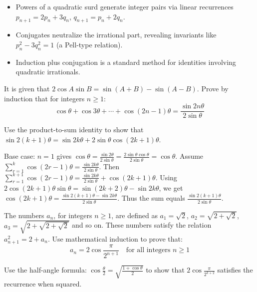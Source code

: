 \begin{takeaways}
\begin{itemize}[leftmargin=*]
\item Powers of a quadratic surd generate integer pairs via linear recurrences $p_{n+1} = 2p_n + 3q_n$, $q_{n+1} = p_n + 2q_n$.
\item Conjugates neutralize the irrational part, revealing invariants like $p_n^2 - 3q_n^2 = 1$ (a Pell-type relation).
\item Induction plus conjugation is a standard method for identities involving quadratic irrationals.
\end{itemize}
\end{takeaways}

\begin{problem}
It is given that $2\cos A \sin B = \sin(A+B) - \sin(A-B)$. Prove by induction that for integers $n \ge 1$:
\[\cos \theta + \cos 3\theta + \cdots + \cos(2n-1)\theta = \frac{\sin 2n\theta}{2\sin\theta}\]
\end{problem}

\begin{hint}
Use the product-to-sum identity to show that $\sin 2(k+1)\theta = \sin 2k\theta + 2\sin\theta \cos(2k+1)\theta$.
\end{hint}

\begin{solution}[Sketch]
Base case: $n=1$ gives $\cos \theta = \frac{\sin 2\theta}{2\sin\theta} = \frac{2\sin\theta\cos\theta}{2\sin\theta} = \cos\theta$. Assume $\sum_{r=1}^{k} \cos(2r-1)\theta = \frac{\sin 2k\theta}{2\sin\theta}$. Then $\sum_{r=1}^{k+1} \cos(2r-1)\theta = \frac{\sin 2k\theta}{2\sin\theta} + \cos(2k+1)\theta$. Using $2\cos(2k+1)\theta \sin\theta = \sin(2k+2)\theta - \sin 2k\theta$, we get $\cos(2k+1)\theta = \frac{\sin 2(k+1)\theta - \sin 2k\theta}{2\sin\theta}$. Thus the sum equals $\frac{\sin 2(k+1)\theta}{2\sin\theta}$.
\end{solution}

\begin{problem}
The numbers $a_n$, for integers $n \ge 1$, are defined as $a_1 = \sqrt{2}$, $a_2 = \sqrt{2+\sqrt{2}}$, $a_3 = \sqrt{2+\sqrt{2+\sqrt{2}}}$ and so on. These numbers satisfy the relation $a_{n+1}^2 = 2 + a_n$. Use mathematical induction to prove that:
\[a_n = 2\cos\frac{\pi}{2^{n+1}} \quad \text{for all integers } n \ge 1\]
\end{problem}

\begin{hint}
Use the half-angle formula: $\cos\frac{\theta}{2} = \sqrt{\frac{1+\cos\theta}{2}}$ to show that $2\cos\frac{\pi}{2^{k+2}}$ satisfies the recurrence when squared.
\end{hint}


